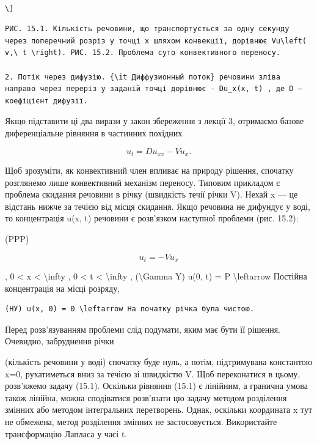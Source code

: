 \documentclass[
]{article}
\begin{document}
\begin{verbatim}

\]
\end{verbatim}

\begin{verbatim}
РИС. 15.1. Кількість речовини, що транспортується за одну секунду через поперечний розріз у точці x шляхом конвекції, дорівнює Vu\left( v,\ t \right). РИС. 15.2. Проблема суто конвективного переносу.

2. Потік через дифузію. {\it Диффузионный поток} речовини зліва направо через переріз у заданій точці дорівнює - Du_x(x, t) , де D — коефіцієнт дифузії.
\end{verbatim}

Якщо підставити ці два вирази у закон збереження з лекції 3, отримаємо
базове диференціальне рівняння в частинних похідних

\[
u_t = Du_{xx} - Vu_x.
\]

Щоб зрозуміти, як конвективний член впливає на природу рішення, спочатку
розглянемо лише конвективний механізм переносу. Типовим прикладом є
проблема скидання речовини в річку (швидкість течії річки V). Нехай x
--- це відстань нижче за течією від місця скидання. Якщо речовина не
дифундує у воді, то концентрація u(x, t) речовини є розв'язком наступної
проблеми (рис. 15.2):

(PPP)

\[
u_t = -Vu_x
\]

, 0 \textless{} x \textless{} \textbackslash infty , 0 \textless{} t
\textless{} \textbackslash infty , (\textbackslash Gamma Y) u(0, t) = P
\textbackslash leftarrow Постійна концентрація на місці розряду,

\begin{verbatim}
(НУ) u(x, 0) = 0 \leftarrow На початку річка була чистою.
\end{verbatim}

Перед розв'язуванням проблеми слід подумати, яким має бути її рішення.
Очевидно, забруднення річки

(кількість речовини у воді) спочатку буде нуль, а потім, підтримувана
константою x=0, рухатиметься вниз за течією зі швидкістю V. Щоб
переконатися в цьому, розв'яжемо задачу (15.1). Оскільки рівняння (15.1)
є лінійним, а гранична умова також лінійна, можна сподіватися розв'язати
цю задачу методом розділення змінних або методом інтегральних
перетворень. Однак, оскільки координата x тут не обмежена, метод
розділення змінних не застосовується. Використайте трансформацію Лапласа
у часі t.
\end{document}
